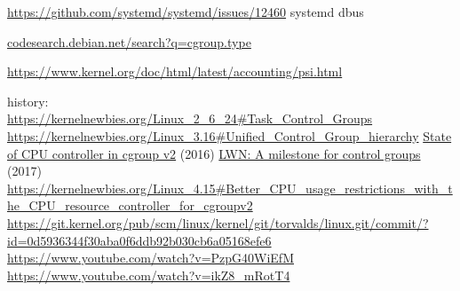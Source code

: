 \documentclass[serif]{beamer}
\begin{document}
\begin{frame}[fragile]
  \url{https://github.com/systemd/systemd/issues/12460} systemd dbus 

  \href{https://codesearch.debian.net/search?q=cgroup.type&literal=1&perpkg=1}{codesearch.debian.net/search?q=cgroup.type}

  \url{https://www.kernel.org/doc/html/latest/accounting/psi.html}

  history:\\
  \url{https://kernelnewbies.org/Linux_2_6_24#Task_Control_Groups}
  \url{https://kernelnewbies.org/Linux_3.16#Unified_Control_Group_hierarchy}
  \href{https://lwn.net/Articles/697369/}{State of CPU controller in cgroup v2} (2016)
  \href{https://lwn.net/Articles/729215/}{LWN: A milestone for control groups} (2017)
  \url{https://kernelnewbies.org/Linux_4.15#Better_CPU_usage_restrictions_with_the_CPU_resource_controller_for_cgroupv2}
  \url{https://git.kernel.org/pub/scm/linux/kernel/git/torvalds/linux.git/commit/?id=0d5936344f30aba0f6ddb92b030cb6a05168efe6}
  \url{https://www.youtube.com/watch?v=PzpG40WiEfM}
  \url{https://www.youtube.com/watch?v=ikZ8_mRotT4}
\end{frame}
\end{document}
